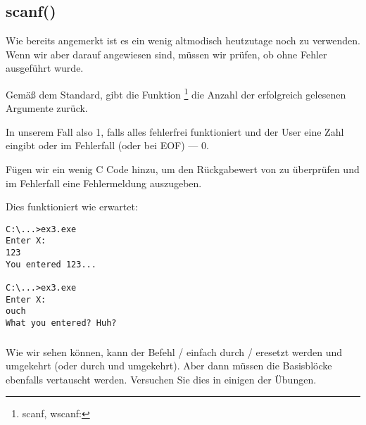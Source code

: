 \subsection{scanf()}
Wie bereits angemerkt ist es ein wenig altmodisch heutzutage noch \scanf zu verwenden. 
Wenn wir aber darauf angewiesen sind, müssen wir prüfen, ob \scanf ohne Fehler ausgeführt wurde.


Gemäß dem Standard, gibt die Funktion \scanf\footnote{scanf, wscanf: \MSDNscanf} die
Anzahl der erfolgreich gelesenen Argumente zurück.

In unserem Fall also 1, falls alles fehlerfrei funktioniert und der User eine Zahl eingibt oder im Fehlerfall (oder bei
\ac{EOF}) --- 0.

Fügen wir ein wenig C Code hinzu, um den Rückgabewert von \scanf zu überprüfen und im Fehlerfall eine Fehlermeldung
auszugeben.

Dies funktioniert wie erwartet:

\begin{lstlisting}
C:\...>ex3.exe
Enter X:
123
You entered 123...

C:\...>ex3.exe
Enter X:
ouch
What you entered? Huh?
\end{lstlisting}






\subsubsection{\Exercise}

Wie wir sehen können, kann der Befehl / einfach durch / eresetzt werden und umgekehrt
(oder  durch  und umgekehrt).
Aber dann müssen die Basisblöcke ebenfalls vertauscht werden. 
Versuchen Sie dies in einigen der Übungen.
